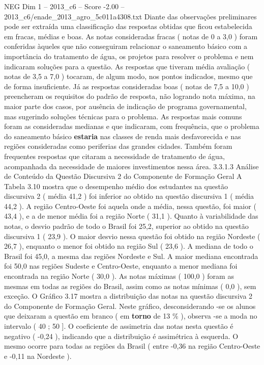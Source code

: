 \begin{textsample}{NEG Dim 1 – 2013\_c6 – Score -2.00 – 2013\_c6/enade\_2013\_agro\_5c011a4308.txt}
Diante das observações preliminares pode ser extraída uma classificação das respostas obtidas que ficou estabelecida em fracas, médias e boas.
As notas consideradas fracas ( notas de 0 a 3,0 ) foram conferidas àqueles que não conseguiram relacionar o saneamento básico com a importância do tratamento de água, os projetos para resolver o problema e nem indicaram soluções para a questão.
As respostas que tiveram média avaliação ( notas de 3,5 a 7,0 ) tocaram, de algum modo, nos pontos indicados, mesmo que de forma insuficiente.
Já as respostas consideradas boas ( notas de 7,5 a 10,0 ) preencheram os requisitos do padrão de resposta, não logrando nota máxima, na maior parte dos casos, por ausência de indicação de programa governamental, mas sugerindo soluções técnicas para o problema.
As respostas mais comuns foram as consideradas medianas e que indicaram, com frequência, que o problema do saneamento básico \textbf{estaria} nas classes de renda mais desfavorecida e nas regiões consideradas como periferias das grandes cidades.
Também foram frequentes respostas que citaram a necessidade de tratamento de água, acompanhada da necessidade de maiores investimentos nessa área. 3.3.1.3 Análise de Conteúdo da Questão Discursiva 2 do Componente de Formação Geral A Tabela 3.10 mostra que o desempenho médio dos estudantes na questão discursiva 2 ( média 41,2 ) foi inferior ao obtido na questão discursiva 1 ( média 44,2 ).
A região Centro-Oeste foi aquela onde a média, nessa questão, foi maior ( 43,4 ), e a de menor média foi a região Norte ( 31,1 ).
Quanto à variabilidade das notas, o desvio padrão de todo o Brasil foi 25,2, superior ao obtido na questão discursiva 1 ( 23,9 ).
O maior desvio nessa questão foi obtido na região Nordeste ( 26,7 ), enquanto o menor foi obtido na região Sul ( 23,6 ).
A mediana de todo o Brasil foi 45,0, a mesma das regiões Nordeste e Sul.
A maior mediana encontrada foi 50,0 nas regiões Sudeste e Centro-Oeste, enquanto a menor mediana foi encontrada na região Norte ( 30,0 ).
As notas máximas ( 100,0 ) foram as mesmas em todas as regiões do Brasil, assim como as notas mínimas ( 0,0 ), sem exceção.
O Gráfico 3.17 mostra a distribuição das notas na questão discursiva 2 do Componente de Formação Geral.
Neste gráfico, desconsiderando -se os alunos que deixaram a questão em branco ( em \textbf{torno} de 13 \% ), observa -se a moda no intervalo ( 40 ; 50 ].
O coeficiente de assimetria das notas nesta questão é negativo ( -0,24 ), indicando que a distribuição é assimétrica à esquerda.
O mesmo ocorre para todas as regiões da Brasil ( entre -0,36 na região Centro-Oeste e -0,11 na Nordeste ).

\end{textsample}
